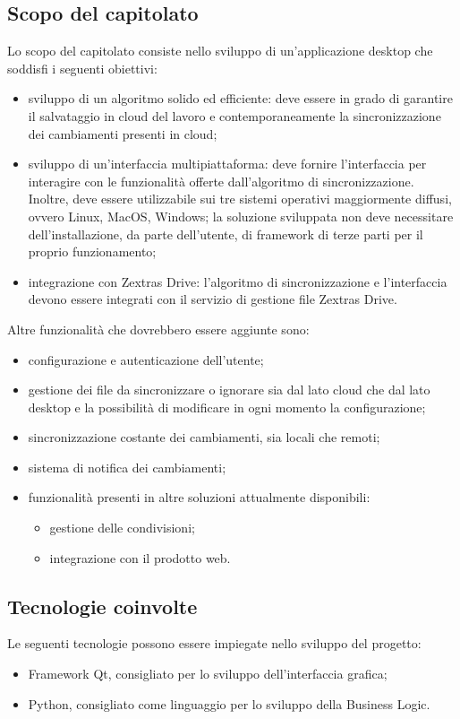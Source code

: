 \subsection{Scopo del capitolato}
Lo scopo del capitolato consiste nello sviluppo di un'applicazione desktop che soddisfi i seguenti obiettivi:
\begin{itemize}
	\item sviluppo di un algoritmo solido ed efficiente: deve essere in grado di garantire il salvataggio in cloud del lavoro e contemporaneamente la sincronizzazione dei cambiamenti presenti in cloud;
	\item sviluppo di un’interfaccia multipiattaforma: deve fornire l'interfaccia per interagire con le funzionalità offerte dall'algoritmo di sincronizzazione. Inoltre, deve essere utilizzabile sui tre sistemi operativi maggiormente diffusi, ovvero Linux, MacOS, Windows; la soluzione sviluppata non deve necessitare dell'installazione, da parte dell'utente, di framework di terze parti per il proprio funzionamento;
	\item integrazione con Zextras Drive: l'algoritmo di sincronizzazione e l'interfaccia devono essere integrati con il servizio di gestione file Zextras Drive.
\end{itemize}
Altre funzionalità che dovrebbero essere aggiunte sono:
\begin{itemize}
	\item configurazione e autenticazione dell'utente;
	\item gestione dei file da sincronizzare o ignorare sia dal lato cloud che dal lato desktop e la possibilità di modificare in ogni momento la configurazione;
	\item sincronizzazione costante dei cambiamenti, sia locali che remoti;
	\item sistema di notifica dei cambiamenti;
	\item funzionalità presenti in altre soluzioni attualmente disponibili:
	\begin{itemize}
		\item gestione delle condivisioni;
		\item integrazione con il prodotto web.
	\end{itemize}
\end{itemize}

\subsection{Tecnologie coinvolte}
Le seguenti tecnologie possono essere impiegate nello sviluppo del progetto:
\begin{itemize}
	\item Framework Qt, consigliato per lo sviluppo dell'interfaccia grafica;
	\item Python, consigliato come linguaggio per lo sviluppo della Business Logic.
\end{itemize}

